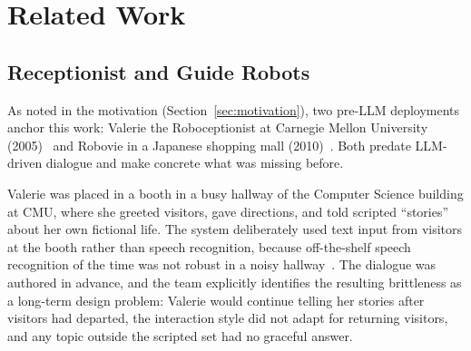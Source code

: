 \chapter{Related Work}
\label{ch:related_work}

%
%


\section{Receptionist and Guide Robots}
\label{sec:related_receptionist}

As noted in the motivation (Section~\ref{sec:motivation}), two pre-LLM deployments anchor this work: Valerie the Roboceptionist at Carnegie Mellon University (2005)~\cite{gockley2005longterm} and Robovie in a Japanese shopping mall (2010)~\cite{kanda2010shoppingmall}.
Both predate LLM-driven dialogue and make concrete what was missing before.

Valerie was placed in a booth in a busy hallway of the Computer Science building at CMU, where she greeted visitors, gave directions, and told scripted ``stories'' about her own fictional life.
The system deliberately used text input from visitors at the booth rather than speech recognition, because off-the-shelf speech recognition of the time was not robust in a noisy hallway~\cite{gockley2005longterm}.
The dialogue was authored in advance, and the team explicitly identifies the resulting brittleness as a long-term design problem: Valerie would continue telling her stories after visitors had departed, the interaction style did not adapt for returning visitors, and any topic outside the scripted set had no graceful answer.

